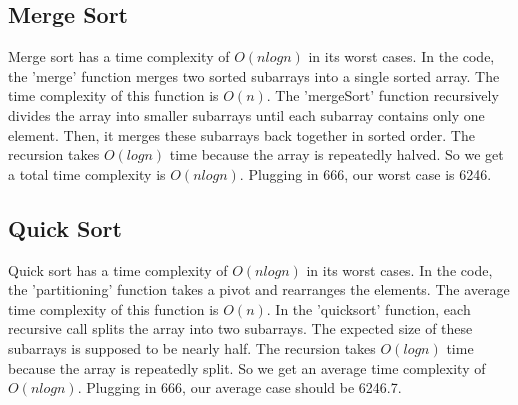 \documentclass[letterpaper, 10pt,DIV=13]{scrartcl}
\numberwithin{equation}{section} %
\numberwithin{figure}{section} %
\numberwithin{table}{section} %
\begin{document}
\subsection{Merge Sort} 
Merge sort has a time complexity of $O(n log n)$ in its worst cases. In the code, the 'merge' function merges two sorted subarrays into a single sorted array. The time complexity of this function is $O(n)$. The 'mergeSort' function recursively divides the array into smaller subarrays until each subarray contains only one element. Then, it merges these subarrays back together in sorted order. The recursion takes $O(log n)$ time because the array is repeatedly halved. So we get a total time complexity is $O(n log n)$. Plugging in 666, our worst case is 6246.
\subsection{Quick Sort} 
Quick sort has a time complexity of $O(n log n)$ in its worst cases. In the code, the 'partitioning' function takes a pivot and rearranges the elements. The average time complexity of this function is $O(n)$. In the 'quicksort' function, each recursive call splits the array into two subarrays. The expected size of these subarrays is supposed to be nearly half. The recursion takes $O(log n)$ time because the array is repeatedly split. So we get an average time complexity of $O(n log n)$. Plugging in 666, our average case should be 6246.7.

\pagebreak
\end{document}
